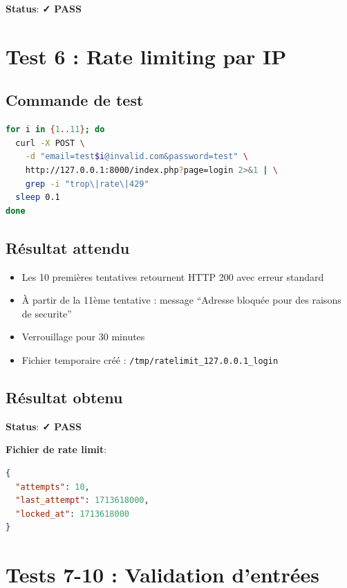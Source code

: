 \documentclass[11pt,a4paper,french]{report}
\newcommand{\pass}{\cellcolor{pass}\textbf{\color{white}✓ PASS}}
\begin{document}
\textbf{Status}: \pass

\newpage

\section{Test 6 : Rate limiting par IP}

\subsection{Commande de test}

\begin{lstlisting}[language=bash]
for i in {1..11}; do
  curl -X POST \
    -d "email=test$i@invalid.com&password=test" \
    http://127.0.0.1:8000/index.php?page=login 2>&1 | \
    grep -i "trop\|rate\|429"
  sleep 0.1
done
\end{lstlisting}

\subsection{Résultat attendu}

\begin{itemize}
    \item Les 10 premières tentatives retournent HTTP 200 avec erreur standard
    \item À partir de la 11ème tentative : message ``Adresse bloquée pour des raisons de securite''
    \item Verrouillage pour 30 minutes
    \item Fichier temporaire créé : \texttt{/tmp/ratelimit\_127.0.0.1\_login}
\end{itemize}

\subsection{Résultat obtenu}

\textbf{Status}: \pass

\textbf{Fichier de rate limit}:
\begin{lstlisting}[language=json]
{
  "attempts": 10,
  "last_attempt": 1713618000,
  "locked_at": 1713618000
}
\end{lstlisting}

\newpage

\section{Tests 7-10 : Validation d'entrées}
\end{document}
